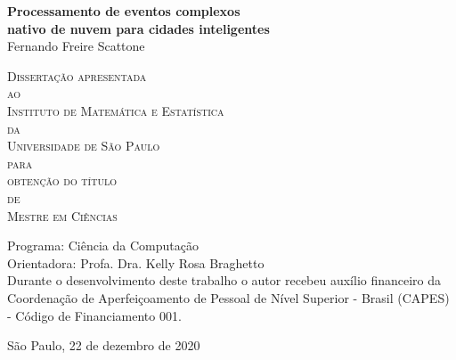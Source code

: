 \documentclass[11pt,twoside,a4paper]{book}
\begin{document}
\frontmatter 
\fancyhead[RO]{{\footnotesize\rightmark}\hspace{2em}\thepage}
\setcounter{tocdepth}{2}
\fancyhead[LE]{\thepage\hspace{2em}\footnotesize{\leftmark}}
\fancyhead[RE,LO]{}
\fancyhead[RO]{{\footnotesize\rightmark}\hspace{2em}\thepage}

\onehalfspacing  %

\thispagestyle{empty}
\begin{center}
    \vspace*{2.3cm}
      \textbf{\Large{Processamento de eventos complexos\\ nativo de nuvem para cidades inteligentes}}\\
    
    \vspace*{1.2cm}
    \Large{Fernando Freire Scattone}
    
    \vskip 2cm
    \textsc{
    Dissertação apresentada\\[-0.25cm] 
    ao\\[-0.25cm]
    Instituto de Matemática e Estatística\\[-0.25cm]
    da\\[-0.25cm]
    Universidade de São Paulo\\[-0.25cm]
    para\\[-0.25cm]
    obtenção do título\\[-0.25cm]
    de\\[-0.25cm]
    Mestre em Ciências}
    
    \vskip 1.5cm
    Programa: Ciência da Computação\\
    Orientadora: Profa. Dra. Kelly Rosa Braghetto\\

   	\vskip 1cm
    \normalsize{Durante o desenvolvimento deste trabalho o autor recebeu auxílio financeiro da Coordenação de Aperfeiçoamento de Pessoal de Nível Superior - Brasil (CAPES) - Código de Financiamento 001.}
    
    \vskip 0.5cm
    \normalsize{São Paulo, 22 de dezembro de 2020}
\end{center}
\end{document}
